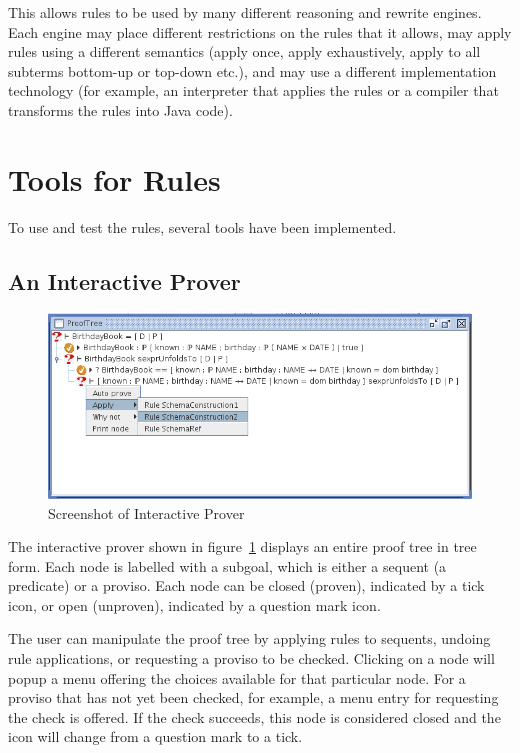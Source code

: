 \documentclass{entcs}
\begin{document}
This allows rules to be used by many different reasoning and rewrite
engines.  Each engine may place different restrictions on the rules
that it allows, may apply rules using a different semantics (apply once,
apply exhaustively, apply to all subterms bottom-up or top-down etc.), and
may use a different implementation technology (for example, an interpreter
that applies the rules or a compiler that transforms the rules into Java
code).


\section{Tools for Rules} \label{sec:tools}

To use and test the rules, several tools have been implemented.

\subsection{An Interactive Prover}

\begin{figure}[htbp]
  \centering
  \includegraphics[width=\textwidth]{cztprover1}
  \caption{Screenshot of Interactive Prover}
  \label{fig:cztprover}
\end{figure}

The interactive prover shown in figure~\ref{fig:cztprover} 
displays an entire proof tree in tree form.  
Each node is labelled with a subgoal, which is either a sequent
(a predicate) or a proviso.  Each node can be closed (proven), indicated
by a tick icon, or open (unproven), indicated by a question mark
icon.

The user can manipulate the proof tree by applying rules to sequents,
undoing rule applications, or requesting a proviso to be checked.
Clicking on a node will popup a menu offering the choices available
for that particular node.  For a proviso that has not yet been
checked, for example, a menu entry for requesting the check is
offered.  If the check succeeds, this node is considered closed and
the icon will change from a question mark to a tick.
\end{document}
